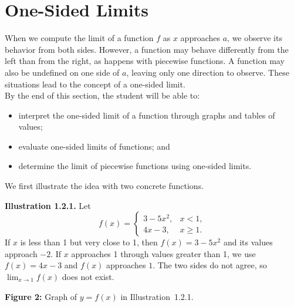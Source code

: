 

\section{One-Sided Limits}
\label{sec:1.2}

When we compute the limit of a function \(f\) as \(x\) approaches \(a\), we observe its behavior from both sides. However, a function may behave differently from the left than from the right, as happens with piecewise functions. A function may also be undefined on one side of \(a\), leaving only one direction to observe. These situations lead to the concept of a one-sided limit. \\
 
By the end of this section, the student will be able to:
\begin{itemize}
    \item interpret the one-sided limit of a function through graphs and tables of values;
    \item evaluate one-sided limits of functions; and
    \item determine the limit of piecewise functions using one-sided limits.
\end{itemize}

\medskip
We first illustrate the idea with two concrete functions.

\medskip
\textbf{Illustration 1.2.1.}
Let
\[
f(x) = \begin{cases}
3 - 5x^{2}, & x < 1, \\[4pt]
4x - 3,     & x \ge 1.
\end{cases}
\]
If \(x\) is less than 1 but very close to 1, then \(f(x) = 3 - 5x^{2}\) and its values approach \(-2\). If \(x\) approaches 1 through values greater than 1, we use \(f(x) = 4x - 3\) and \(f(x)\) approaches \(1\). The two sides do not agree, so \(\lim_{x \to 1} f(x)\) does not exist.

\begin{center}

\smallskip
\textbf{Figure 2:} Graph of \(y = f(x)\) in Illustration~1.2.1.
\end{center}

